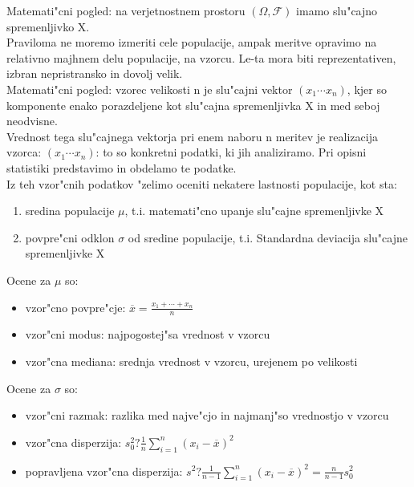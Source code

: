 \documentclass[a4paper,12pt]{article}
\theoremstyle{definition}
\theoremstyle{remark}
\begin{document}
Matemati"cni pogled: na verjetnostnem prostoru $(\Omega, \mathcal{F})$ imamo slu"cajno spremenljivko X. \\
Praviloma ne moremo izmeriti cele populacije, ampak meritve opravimo na relativno majhnem delu populacije,
na vzorcu. Le-ta mora biti reprezentativen, izbran nepristransko in dovolj velik. \\
Matemati"cni pogled: vzorec velikosti n je slu"cajni vektor $(x_1 \cdots x_n)$, kjer so komponente enako porazdeljene
kot slu"cajna spremenljivka X in med seboj neodvisne. \\
Vrednost tega slu"cajnega vektorja pri enem naboru n meritev je realizacija vzorca: $(x_1 \cdots x_n)$: to so
konkretni podatki, ki jih analiziramo. Pri opisni statistiki predstavimo in obdelamo te podatke. \\
Iz teh vzor"cnih podatkov "zelimo oceniti nekatere lastnosti populacije, kot sta:

\begin{enumerate}
    \item sredina populacije $\mu$, t.i. matemati"cno upanje slu"cajne spremenljivke X
    \item povpre"cni odklon $\sigma$ od sredine populacije, t.i. Standardna deviacija slu"cajne spremenljivke X
\end{enumerate}




Ocene za $\mu$ so:

\begin{itemize}
    \item vzor"cno povpre"cje: $\overline{x} = \frac{x_1 + \cdots + x_n}{n}$
    \item vzor"cni modus: najpogostej"sa vrednost v vzorcu
    \item vzor"cna mediana: srednja vrednost v vzorcu, urejenem po velikosti
\end{itemize}

Ocene za $\sigma$ so:

\begin{itemize}
    \item vzor"cni razmak: razlika med najve"cjo in najmanj"so vrednostjo v vzorcu
    \item vzor"cna disperzija: $s_0^2 ? \frac{1}{n} \sum_{i=1}^n (x_i - \overline{x})^2$
    \item popravljena vzor"cna disperzija: $s^2 ? \frac{1}{n-1} \sum_{i=1}^n (x_i - \overline{x})^2 =
        \frac{n}{n-1} s_0^2$
\end{itemize}
\end{document}
